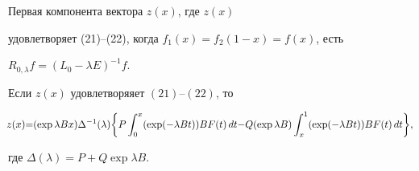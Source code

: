 \begin{cornonum}


Первая компонента вектора $z(x)$, где $z(x)$


удовлетворяет (21)--(22), когда $f_1(x)=f_2(1-x)=f(x)$, есть


$R_{0,\lambda}f=(L_0-\lambda E)^{-1}f$.


\end{cornonum}





\begin{lem}


Если $z(x)$ удовлетворяяет $(21)$--$(22)$, то


\begin{equation}


\negthickspace z(x){=}(\exp\lambda Bx)\Delta^{-1}(\lambda)\bigg\{


P\int_0^x(\exp(-\lambda Bt))BF(t)\, dt{-}


Q(\exp\lambda B)\int_x^1(\exp(-\lambda Bt))BF(t)\, dt\bigg\},


\end{equation}


где $\Delta(\lambda)=P+Q\exp\lambda B$.


\end{lem}





